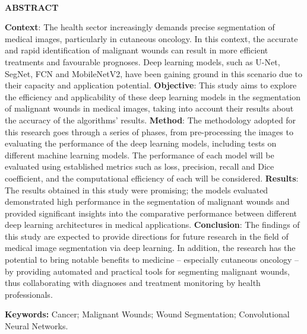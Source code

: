 \begin{center}
    \textbf{\\ABSTRACT \\ }
\end{center}

\textbf{Context}: The health sector increasingly demands precise segmentation of medical images, particularly in cutaneous oncology. In this context, the accurate and rapid identification of malignant wounds can result in more efficient treatments and favourable prognoses. Deep learning models, such as \acf{U-Net}, \acf{SegNet}, \acf{FCN} and \acf{MobileNetV2}, have been gaining ground in this scenario due to their capacity and application potential. \textbf{Objective}: This study aims to explore the efficiency and applicability of these deep learning models in the segmentation of malignant wounds in medical images, taking into account their results about the accuracy of the algorithms' results. \textbf{Method}: The methodology adopted for this research goes through a series of phases, from pre-processing the images to evaluating the performance of the deep learning models, including tests on different machine learning models. The performance of each model will be evaluated using established metrics such as loss, precision, recall and Dice coefficient, and the computational efficiency of each will be considered. \textbf{Results}: The results obtained in this study were promising; the models evaluated demonstrated high performance in the segmentation of malignant wounds and provided significant insights into the comparative performance between different deep learning architectures in medical applications. \textbf{Conclusion}: The findings of this study are expected to provide directions for future research in the field of medical image segmentation via deep learning. In addition, the research has the potential to bring notable benefits to medicine -- especially cutaneous oncology -- by providing automated and practical tools for segmenting malignant wounds, thus collaborating with diagnoses and treatment monitoring by health professionals.

\textbf{Keywords:} Cancer; Malignant Wounds; Wound Segmentation; Convolutional Neural Networks.